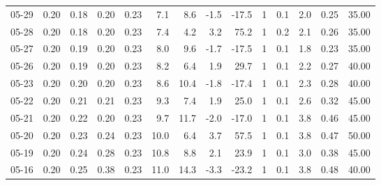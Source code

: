\begin{threeparttable}
{\begin{tabular}{lrrrrrrrrrrrrr}
  05-29 &          0.20 &          0.18 &          0.20 &        0.23 &                 7.1 &                 8.6 &       -1.5 &        -17.5 &              1 &                 0.1 &              2.0 &            0.25 &                  35.00 \\
  05-28 &          0.20 &          0.18 &          0.20 &        0.23 &                 7.4 &                 4.2 &        3.2 &         75.2 &              1 &                 0.2 &              2.1 &            0.26 &                  35.00 \\
  05-27 &          0.20 &          0.19 &          0.20 &        0.23 &                 8.0 &                 9.6 &       -1.7 &        -17.5 &              1 &                 0.1 &              1.8 &            0.23 &                  35.00 \\
  05-26 &          0.20 &          0.19 &          0.20 &        0.23 &                 8.2 &                 6.4 &        1.9 &         29.7 &              1 &                 0.1 &              2.2 &            0.27 &                  40.00 \\
  05-23 &          0.20 &          0.20 &          0.20 &        0.23 &                 8.6 &                10.4 &       -1.8 &        -17.4 &              1 &                 0.1 &              2.3 &            0.28 &                  40.00 \\
  05-22 &          0.20 &          0.21 &          0.21 &        0.23 &                 9.3 &                 7.4 &        1.9 &         25.0 &              1 &                 0.1 &              2.6 &            0.32 &                  45.00 \\
  05-21 &          0.20 &          0.22 &          0.20 &        0.23 &                 9.7 &                11.7 &       -2.0 &        -17.0 &              1 &                 0.1 &              3.8 &            0.46 &                  45.00 \\
  05-20 &          0.20 &          0.23 &          0.24 &        0.23 &                10.0 &                 6.4 &        3.7 &         57.5 &              1 &                 0.1 &              3.8 &            0.47 &                  50.00 \\
  05-19 &          0.20 &          0.24 &          0.28 &        0.23 &                10.8 &                 8.8 &        2.1 &         23.9 &              1 &                 0.1 &              3.0 &            0.38 &                  45.00 \\
  05-16 &          0.20 &          0.25 &          0.38 &        0.23 &                11.0 &                14.3 &       -3.3 &        -23.2 &              1 &                 0.1 &              3.8 &            0.48 &                  40.00 \\

\end{tabular}}
\end{threeparttable}
